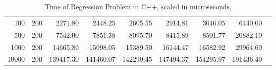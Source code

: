 \begin{table}[ht]
\begin{tabular}{rrrrrrrrr}
  100 & 200 & 2271.80 & 2448.25 & 2605.55 & 2914.81 & 3046.05 & 6440.00 \\ 
  500 & 200 & 7542.00 & 7851.38 & 8095.70 & 8415.89 & 8501.77 & 20882.10 \\ 
  1000 & 200 & 14665.80 & 15098.05 & 15389.50 & 16144.47 & 16582.92 & 29964.60 \\ 
  10000 & 200 & 139417.30 & 141460.07 & 142299.45 & 147494.37 & 154295.97 & 191436.40 \\  
   \hline
\end{tabular}
\caption[Regression Time C++]{Time of Regression Problem in C++, scaled in microseconds.}
\label{reg:time_cpp}
\end{table}